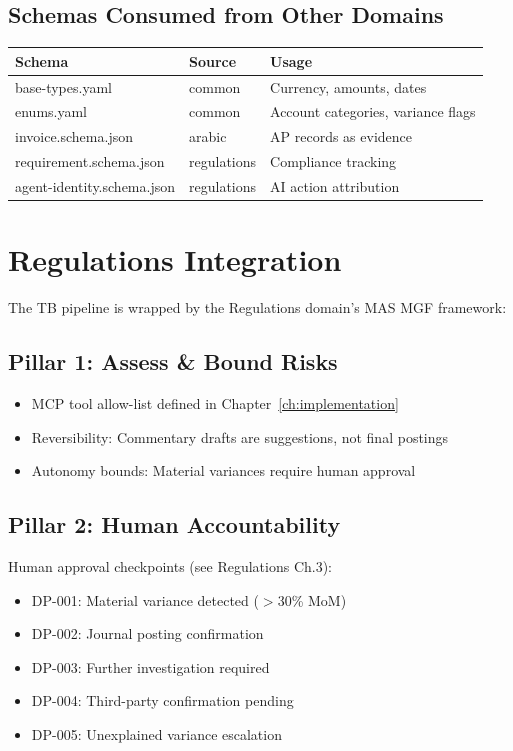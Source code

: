 \subsection{Schemas Consumed from Other Domains}

\begin{tabularx}{\linewidth}{@{}l l X@{}}
\toprule
\textbf{Schema} & \textbf{Source} & \textbf{Usage} \\
\midrule
base-types.yaml & common & Currency, amounts, dates \\
enums.yaml & common & Account categories, variance flags \\
invoice.schema.json & arabic & AP records as evidence \\
requirement.schema.json & regulations & Compliance tracking \\
agent-identity.schema.json & regulations & AI action attribution \\
\bottomrule
\end{tabularx}

\section{Regulations Integration}
\label{sec:reg-integration}

The TB pipeline is wrapped by the Regulations domain's MAS MGF framework:

\subsection{Pillar 1: Assess \& Bound Risks}

\begin{itemize}
  \item MCP tool allow-list defined in Chapter~\ref{ch:implementation}
  \item Reversibility: Commentary drafts are suggestions, not final postings
  \item Autonomy bounds: Material variances require human approval
\end{itemize}

\subsection{Pillar 2: Human Accountability}

Human approval checkpoints (see Regulations Ch.3):
\begin{itemize}
  \item DP-001: Material variance detected ($>$30\% MoM)
  \item DP-002: Journal posting confirmation
  \item DP-003: Further investigation required
  \item DP-004: Third-party confirmation pending
  \item DP-005: Unexplained variance escalation
\end{itemize}


